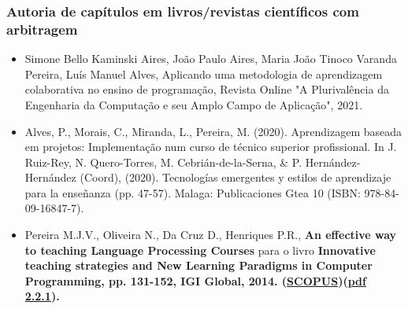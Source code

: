\documentclass[11pt]{article}
\begin{document}
\subsubsection{Autoria de capítulos em livros/revistas científicos com arbitragem}
\begin{itemize}

\item{ Simone Bello Kaminski Aires, João Paulo Aires, Maria João Tinoco Varanda Pereira, Luís Manuel Alves, Aplicando uma metodologia de aprendizagem colaborativa no ensino de programação, Revista Online "A Plurivalência da Engenharia da Computação e seu Amplo Campo de Aplicação", 2021.}

\item{ Alves, P., Morais, C., Miranda, L., Pereira, M. (2020). Aprendizagem baseada em projetos: Implementação num curso de técnico superior profissional. In J. Ruiz-Rey, N. Quero-Torres, M. Cebrián-de-la-Serna, & P. Hernández-Hernández (Coord), (2020). Tecnologías emergentes y estilos de aprendizaje para la enseñanza (pp. 47-57). Malaga: Publicaciones Gtea 10 (ISBN: 978-84-09-16847-7).}

\item{ Pereira M.J.V., Oliveira N., Da Cruz D., Henriques P.R., {\bf{ {An effective way to teaching Language Processing Courses}}} para o livro {\bf{ {Innovative teaching strategies and New Learning Paradigms in Computer Programming}}, pp. 131-152, IGI Global, 2014. (\href{run:Publicacoes/PublicacoesSCOPUS.pdf}{SCOPUS})(\href{run:Publicacoes/publicacoes/78.pdf}{pdf 2.2.1}).}}


\end{itemize}
\end{document}
